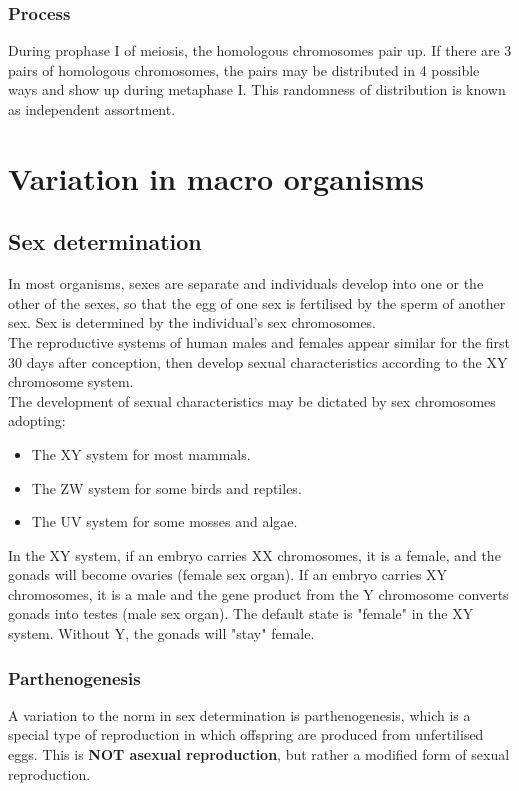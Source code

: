 \documentclass[11pt]{article}
\begin{document}
\subsubsection{Process}
\label{sec:orgde1dc1a}
During prophase I of meiosis, the homologous chromosomes pair up. If there are 3 pairs of homologous chromosomes, the pairs may be distributed in 4 possible ways and show up during metaphase I. This randomness of distribution is known as independent assortment.


\section{Variation in macro organisms}
\label{sec:orgb55773d}

\subsection{Sex determination}
\label{sec:org0c3b1aa}
In most organisms, sexes are separate and individuals develop into one or the other of the sexes, so that the egg of one sex is fertilised by the sperm of another sex. Sex is determined by the individual's sex chromosomes.
\\[0pt]

The reproductive systems of human males and females appear similar for the first 30 days after conception, then develop sexual characteristics according to the XY chromosome system.
\\[0pt]

The development of sexual characteristics may be dictated by sex chromosomes adopting:
\begin{itemize}
\item The XY system for most mammals.
\item The ZW system for some birds and reptiles.
\item The UV system for some mosses and algae.
\end{itemize}

In the XY system, if an embryo carries XX chromosomes, it is a female, and the gonads will become ovaries (female sex organ). If an embryo carries XY chromosomes, it is a male and the gene product from the Y chromosome converts gonads into testes (male sex organ). The default state is "female" in the XY system. Without Y, the gonads will "stay" female.

\newpage

\subsubsection{Parthenogenesis}
\label{sec:org9198f7d}
A variation to the norm in sex determination is parthenogenesis, which is a special type of reproduction in which offspring are produced from unfertilised eggs. This is \textbf{NOT asexual reproduction}, but rather a modified form of sexual reproduction.
\\[0pt]
\end{document}
